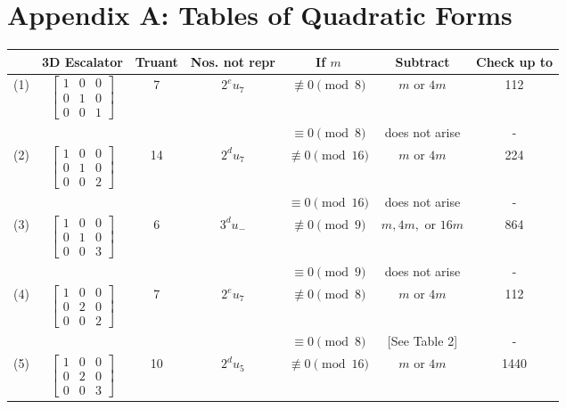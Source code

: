 \section{Appendix A: Tables of Quadratic Forms}

{
\setcounter{table}{0}
\renewcommand{\thetable}{A.\arabic{table}}

\begin{table}[ht]
    \centering
    \begin{tabular}{|c|c|c|c|c|c|c|}
    \hline
     & 3D Escalator & Truant & Nos. not repr\footnotemark & If $m$ & Subtract & Check up to \\ \hline
    (1) & $\begin{bmatrix} 1 & 0 & 0 \\ 0 & 1 & 0 \\ 0 & 0 & 1 \end{bmatrix}$ & 7 & $2^e u_7$ & $\not\equiv 0 \pmod{8}$ & $m$ or $4m$ & 112 \\
     & & & & $\equiv 0 \pmod{8}$ & does not arise & - \\ \hline
    (2) & $\begin{bmatrix} 1 & 0 & 0 \\ 0 & 1 & 0 \\ 0 & 0 & 2 \end{bmatrix}$ & 14 & $2^d u_7$ & $\not\equiv 0 \pmod{16}$ & $m$ or $4m$ & 224 \\
     & & & & $\equiv 0 \pmod{16}$ & does not arise & - \\ \hline
    (3) & $\begin{bmatrix} 1 & 0 & 0 \\ 0 & 1 & 0 \\ 0 & 0 & 3 \end{bmatrix}$ & 6 & $3^d u_-$ & $\not\equiv 0 \pmod{9}$ & $m, 4m,$ or $16m$ & 864 \\
     & & & & $\equiv 0 \pmod{9}$ & does not arise & - \\ \hline
    (4) & $\begin{bmatrix} 1 & 0 & 0 \\ 0 & 2 & 0 \\ 0 & 0 & 2 \end{bmatrix}$ & 7 & $2^e u_7$ & $\not\equiv 0 \pmod{8}$ & $m$ or $4m$ & 112 \\
     & & & & $\equiv 0 \pmod{8}$ & [See Table 2] & - \\ \hline
    (5) & $\begin{bmatrix} 1 & 0 & 0 \\ 0 & 2 & 0 \\ 0 & 0 & 3 \end{bmatrix}$ & 10 & $2^d u_5$ & $\not\equiv 0 \pmod{16}$ & $m$ or $4m$ & 1440 \\

\end{tabular}
\end{table}}
